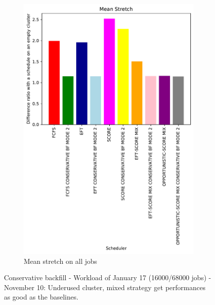 \documentclass[a4paper]{article}
\begin{document}
\begin{figure}[H]
\begin{subfigure}[b]{0.4\linewidth}\centering\includegraphics[width=0.9\linewidth]{MBSS/plot/Results_FCFS_Score_Backfill_2022-01-17->2022-01-17_V9271_Mean_Stretch_450_128_32_256_4_1024.pdf}\caption{Mean stretch on all jobs}\end{subfigure}
\caption{Conservative backfill - Workload of January 17 (16000/68000 jobs) - November 10: Underused cluster, mixed strategy get performances as good as the baselines.}\end{figure}
\end{document}

